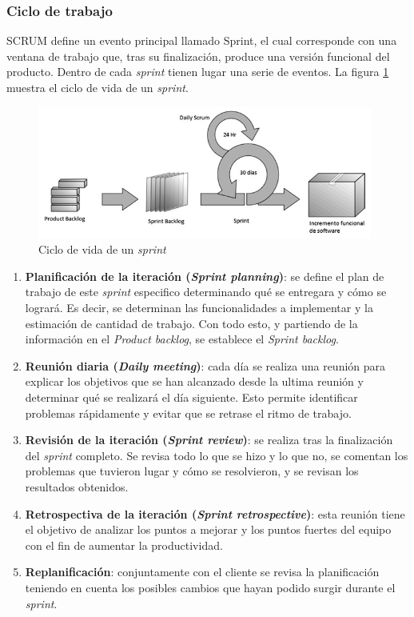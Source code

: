 \subsubsection{Ciclo de trabajo}
	    SCRUM define un evento principal llamado Sprint, el cual corresponde con una ventana de trabajo que, tras su finalización, produce una versión funcional del producto. Dentro de cada \textit{sprint} tienen lugar una serie de eventos. La figura \ref{fig::cicloDeVidaSprint} muestra el ciclo de vida de un \textit{sprint}. 
	    
\begin{figure}
    \centerline{\includegraphics[width=11cm]{figuras/fasesDeUnSprint.png}}
    \caption{Ciclo de vida de un \textit{sprint}}
    \label{fig::cicloDeVidaSprint}
\end{figure}

\begin{enumerate}
		\item \textbf{Planificación de la iteración (\textit{Sprint planning})}: se define el plan de trabajo de este \textit{sprint} especifico determinando qué se entregara y cómo se logrará. Es decir, se determinan las funcionalidades a implementar y la estimación de cantidad de trabajo. Con todo esto, y partiendo de la información en el \emph{Product backlog}, se establece el \emph{Sprint backlog}.
		\item \textbf{Reunión diaria (\textit{Daily meeting})}: cada día se realiza una reunión para explicar los objetivos que se han alcanzado desde la ultima reunión y determinar qué se realizará el día siguiente. Esto permite identificar problemas rápidamente y evitar que se retrase el ritmo de trabajo. \item \textbf{Revisión de la iteración (\emph{Sprint review})}: se realiza tras la finalización del \textit{sprint} completo. Se revisa todo lo que se hizo y lo que no, se comentan los problemas que tuvieron lugar y cómo se resolvieron, y se revisan los resultados obtenidos. 
		\item \textbf{Retrospectiva de la iteración (\emph{Sprint retrospective})}: esta reunión tiene el objetivo de analizar los puntos a mejorar y los puntos fuertes del equipo con el fin de aumentar la productividad.
		\item \textbf{Replanificación}: conjuntamente con el cliente se revisa la planificación teniendo en cuenta los posibles cambios que hayan podido surgir durante el \emph{sprint}.
\end{enumerate}
			
